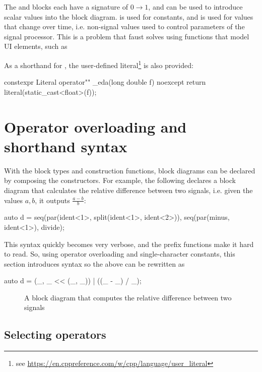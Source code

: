 The  and  blocks each have a signature of $0 \rightarrow 1$, and can be used to
introduce scalar values into the block diagram.  is used for constants, and  is used for values that change
over time, i.e. non-signal values used to control parameters of the signal processor. This is a problem that
faust solves using functions that model UI elements, such as \autocite{orlarey2004}

As a shorthand for , the user-defined literal\footnote{see \url{https://en.cppreference.com/w/cpp/language/user_literal}}  is also
provided:
\begin{cppcodenl}
  constexpr Literal operator"" _eda(long double f) noexcept
  {
    return literal(static_cast<float>(f));
  }
\end{cppcodenl}

\section{Operator overloading and shorthand syntax}

With the block types and construction functions, block diagrams can be declared by composing the
constructors. For example, the following declares a block diagram that calculates the relative difference
between two signals, i.e. given the values $a, b$, it outputs $\frac{a - b}{b}$:

\begin{cppcodenl}
  auto d = seq(par(ident<1>, split(ident<1>, ident<2>)), seq(par(minus, ident<1>), divide);
\end{cppcodenl}

This syntax quickly becomes very verbose, and the prefix functions make it hard to read. So, using operator
overloading and single-character constants, this section introduces syntax so the above can be rewritten as

\begin{cppcodenl}
  auto d = (_, _ << (_, _)) | ((_ - _) / _);
\end{cppcodenl}

\begin{figure}
  \centering
  
  \caption{A block diagram that computes the relative difference between two signals}
  \label{fig:block_reldiff}
\end{figure}

\subsection{Selecting operators}

